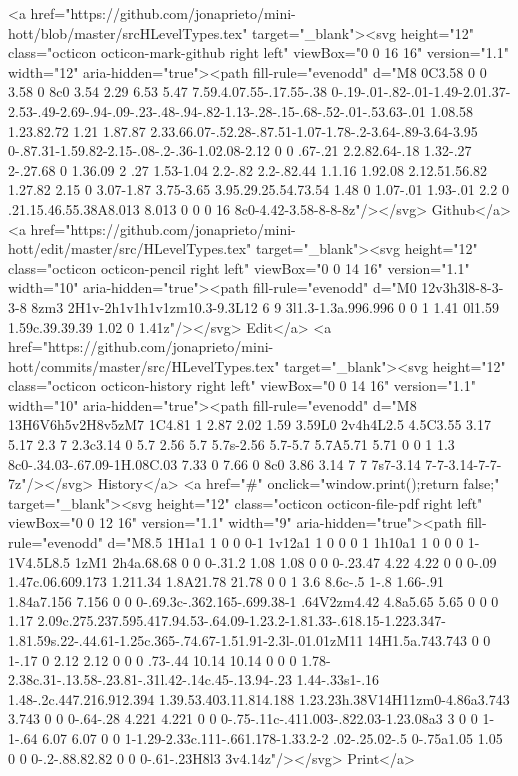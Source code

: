 {      <a href="https://github.com/jonaprieto/mini-hott/blob/master/srcHLevelTypes.tex" target="_blank"><svg height="12" class="octicon octicon-mark-github right left" viewBox="0 0 16 16" version="1.1" width="12" aria-hidden="true"><path fill-rule="evenodd" d="M8 0C3.58 0 0 3.58 0 8c0 3.54 2.29 6.53 5.47 7.59.4.07.55-.17.55-.38 0-.19-.01-.82-.01-1.49-2.01.37-2.53-.49-2.69-.94-.09-.23-.48-.94-.82-1.13-.28-.15-.68-.52-.01-.53.63-.01 1.08.58 1.23.82.72 1.21 1.87.87 2.33.66.07-.52.28-.87.51-1.07-1.78-.2-3.64-.89-3.64-3.95 0-.87.31-1.59.82-2.15-.08-.2-.36-1.02.08-2.12 0 0 .67-.21 2.2.82.64-.18 1.32-.27 2-.27.68 0 1.36.09 2 .27 1.53-1.04 2.2-.82 2.2-.82.44 1.1.16 1.92.08 2.12.51.56.82 1.27.82 2.15 0 3.07-1.87 3.75-3.65 3.95.29.25.54.73.54 1.48 0 1.07-.01 1.93-.01 2.2 0 .21.15.46.55.38A8.013 8.013 0 0 0 16 8c0-4.42-3.58-8-8-8z"/></svg> Github</a>
      <a href="https://github.com/jonaprieto/mini-hott/edit/master/src/HLevelTypes.tex" target="_blank"><svg height="12" class="octicon octicon-pencil right left" viewBox="0 0 14 16" version="1.1" width="10" aria-hidden="true"><path fill-rule="evenodd" d="M0 12v3h3l8-8-3-3-8 8zm3 2H1v-2h1v1h1v1zm10.3-9.3L12 6 9 3l1.3-1.3a.996.996 0 0 1 1.41 0l1.59 1.59c.39.39.39 1.02 0 1.41z"/></svg> Edit</a>
      <a href="https://github.com/jonaprieto/mini-hott/commits/master/src/HLevelTypes.tex" target="_blank"><svg height="12" class="octicon octicon-history right left" viewBox="0 0 14 16" version="1.1" width="10" aria-hidden="true"><path fill-rule="evenodd" d="M8 13H6V6h5v2H8v5zM7 1C4.81 1 2.87 2.02 1.59 3.59L0 2v4h4L2.5 4.5C3.55 3.17 5.17 2.3 7 2.3c3.14 0 5.7 2.56 5.7 5.7s-2.56 5.7-5.7 5.7A5.71 5.71 0 0 1 1.3 8c0-.34.03-.67.09-1H.08C.03 7.33 0 7.66 0 8c0 3.86 3.14 7 7 7s7-3.14 7-7-3.14-7-7-7z"/></svg> History</a>
      <a  href="#" onclick="window.print();return false;" target="_blank"><svg height="12" class="octicon octicon-file-pdf right left" viewBox="0 0 12 16" version="1.1" width="9" aria-hidden="true"><path fill-rule="evenodd" d="M8.5 1H1a1 1 0 0 0-1 1v12a1 1 0 0 0 1 1h10a1 1 0 0 0 1-1V4.5L8.5 1zM1 2h4a.68.68 0 0 0-.31.2 1.08 1.08 0 0 0-.23.47 4.22 4.22 0 0 0-.09 1.47c.06.609.173 1.211.34 1.8A21.78 21.78 0 0 1 3.6 8.6c-.5 1-.8 1.66-.91 1.84a7.156 7.156 0 0 0-.69.3c-.362.165-.699.38-1 .64V2zm4.42 4.8a5.65 5.65 0 0 0 1.17 2.09c.275.237.595.417.94.53-.64.09-1.23.2-1.81.33-.618.15-1.223.347-1.81.59s.22-.44.61-1.25c.365-.74.67-1.51.91-2.3l-.01.01zM11 14H1.5a.743.743 0 0 1-.17 0 2.12 2.12 0 0 0 .73-.44 10.14 10.14 0 0 0 1.78-2.38c.31-.13.58-.23.81-.31l.42-.14c.45-.13.94-.23 1.44-.33s1-.16 1.48-.2c.447.216.912.394 1.39.53.403.11.814.188 1.23.23h.38V14H11zm0-4.86a3.743 3.743 0 0 0-.64-.28 4.221 4.221 0 0 0-.75-.11c-.411.003-.822.03-1.23.08a3 3 0 0 1-1-.64 6.07 6.07 0 0 1-1.29-2.33c.111-.661.178-1.33.2-2 .02-.25.02-.5 0-.75a1.05 1.05 0 0 0-.2-.88.82.82 0 0 0-.61-.23H8l3 3v4.14z"/></svg> Print</a>
}
